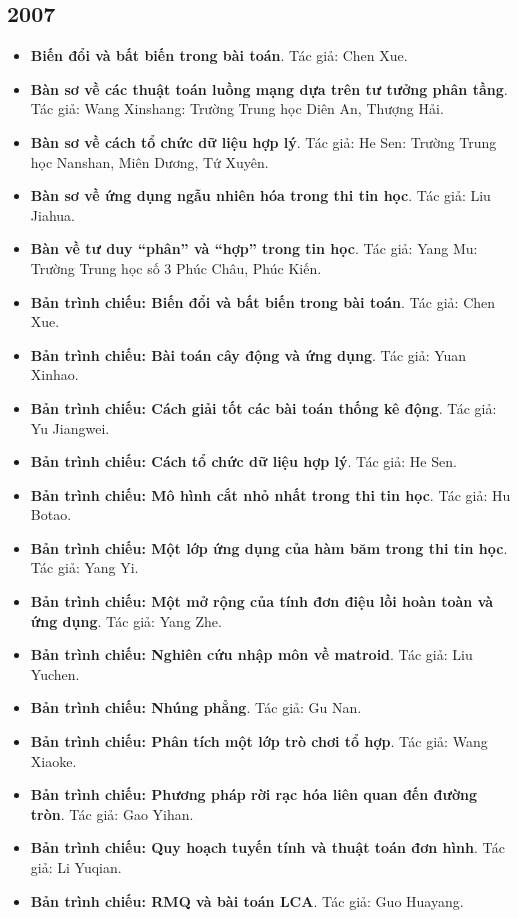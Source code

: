\documentclass[11pt]{article}
\begin{document}
\subsection{2007}
\begin{itemize}[leftmargin=2em]
  \item \textbf{Biến đổi và bất biến trong bài toán}. Tác giả: Chen Xue.
  \item \textbf{Bàn sơ về các thuật toán luồng mạng dựa trên tư tưởng phân tầng}. Tác giả: Wang Xinshang: Trường Trung học Diên An, Thượng Hải.
  \item \textbf{Bàn sơ về cách tổ chức dữ liệu hợp lý}. Tác giả: He Sen: Trường Trung học Nanshan, Miên Dương, Tứ Xuyên.
  \item \textbf{Bàn sơ về ứng dụng ngẫu nhiên hóa trong thi tin học}. Tác giả: Liu Jiahua.
  \item \textbf{Bàn về tư duy ``phân'' và ``hợp'' trong tin học}. Tác giả: Yang Mu: Trường Trung học số 3 Phúc Châu, Phúc Kiến.
  \item \textbf{Bản trình chiếu: Biến đổi và bất biến trong bài toán}. Tác giả: Chen Xue.
  \item \textbf{Bản trình chiếu: Bài toán cây động và ứng dụng}. Tác giả: Yuan Xinhao.
  \item \textbf{Bản trình chiếu: Cách giải tốt các bài toán thống kê động}. Tác giả: Yu Jiangwei.
  \item \textbf{Bản trình chiếu: Cách tổ chức dữ liệu hợp lý}. Tác giả: He Sen.
  \item \textbf{Bản trình chiếu: Mô hình cắt nhỏ nhất trong thi tin học}. Tác giả: Hu Botao.
  \item \textbf{Bản trình chiếu: Một lớp ứng dụng của hàm băm trong thi tin học}. Tác giả: Yang Yi.
  \item \textbf{Bản trình chiếu: Một mở rộng của tính đơn điệu lồi hoàn toàn và ứng dụng}. Tác giả: Yang Zhe.
  \item \textbf{Bản trình chiếu: Nghiên cứu nhập môn về matroid}. Tác giả: Liu Yuchen.
  \item \textbf{Bản trình chiếu: Nhúng phẳng}. Tác giả: Gu Nan.
  \item \textbf{Bản trình chiếu: Phân tích một lớp trò chơi tổ hợp}. Tác giả: Wang Xiaoke.
  \item \textbf{Bản trình chiếu: Phương pháp rời rạc hóa liên quan đến đường tròn}. Tác giả: Gao Yihan.
  \item \textbf{Bản trình chiếu: Quy hoạch tuyến tính và thuật toán đơn hình}. Tác giả: Li Yuqian.
  \item \textbf{Bản trình chiếu: RMQ và bài toán LCA}. Tác giả: Guo Huayang.

\end{itemize}
\end{document}
